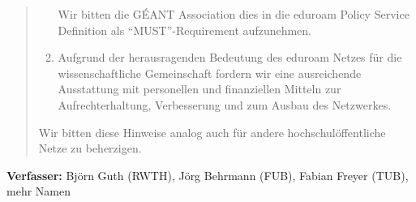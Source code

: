 \documentclass[12pt,oneside]{scrartcl}
\begin{document}
\begin{quote}
\begin{enumerate}
    Wir bitten die GÉANT Association dies in die eduroam Policy Service Definition
    als ``MUST''-Requirement aufzunehmen.

  \item Aufgrund der herausragenden Bedeutung des eduroam Netzes für die
    wissenschaftliche Gemeinschaft fordern wir eine ausreichende Ausstattung mit
    personellen und finanziellen Mitteln zur Aufrechterhaltung, Verbesserung und
    zum Ausbau des Netzwerkes.
  \end{enumerate}

  Wir bitten diese Hinweise analog auch für andere hochschulöffentliche Netze zu
  beherzigen.

\end{quote}

\vspace{1cm}
\textbf{Verfasser:} Björn Guth (RWTH), Jörg Behrmann (FUB), Fabian Freyer (TUB), mehr Namen
\end{document}
